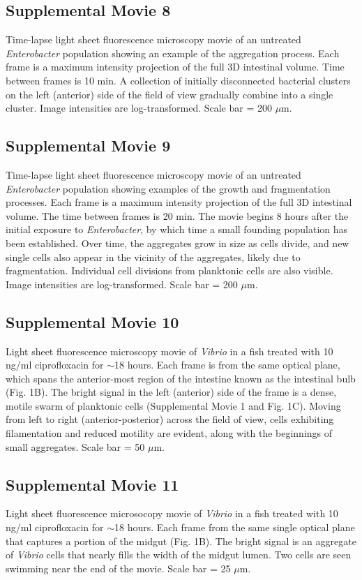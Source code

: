 \documentclass[12pt]{article}
\begin{document}
\subsection*{Supplemental Movie 8}
Time-lapse light sheet fluorescence microscopy movie of an untreated \textit{Enterobacter} population showing an example of the aggregation process. Each frame is a maximum intensity projection of the full 3D intestinal volume. Time between frames is 10 min. A collection of initially disconnected bacterial clusters on the left (anterior) side of the field of view gradually combine into a single cluster. Image intensities are log-transformed. Scale bar = 200 $\mu$m.

\subsection*{Supplemental Movie 9}
Time-lapse light sheet fluorescence microscopy movie of an untreated \textit{Enterobacter} population showing examples of the growth and fragmentation processes. Each frame is a maximum intensity projection of the full 3D intestinal volume. The time between frames is 20 min. The movie begins 8 hours after the initial exposure to \textit{Enterobacter}, by which time a small founding population has been established. Over time, the aggregates grow in size as cells divide, and new single cells also appear in the vicinity of the aggregates, likely due to fragmentation. Individual cell divisions from planktonic cells are also visible. Image intensities are log-transformed. Scale bar = 200 $\mu$m.

\subsection*{Supplemental Movie 10}
Light sheet fluorescence microscopy movie of \textit{Vibrio} in a fish treated with 10 ng/ml ciprofloxacin for $\sim$18 hours. Each frame is from the same optical plane, which spans the anterior-most region of the intestine known as the intestinal bulb (Fig. 1B). The bright signal in the left (anterior) side of the frame is a dense, motile swarm of planktonic cells (Supplemental Movie 1 and Fig. 1C). Moving from left to right (anterior-posterior) across the field of view, cells exhibiting filamentation and reduced motility are evident, along with the beginnings of small aggregates. Scale bar = 50 $\mu$m.

\subsection*{Supplemental Movie 11}
Light sheet fluorescence microsocopy movie of \textit{Vibrio} in a fish treated with 10 ng/ml ciprofloxacin for $\sim$18 hours. Each frame from the same single optical plane that captures a portion of the midgut (Fig. 1B). The bright signal is an aggregate of \textit{Vibrio} cells that nearly fills the width of the midgut lumen. Two cells are seen swimming near the end of the movie. Scale bar = 25 $\mu$m.
\end{document}

